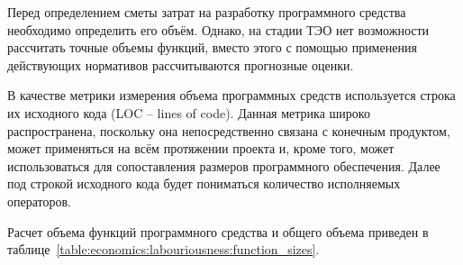 Перед определением сметы затрат на разработку программного средства необходимо определить его объём.
Однако, на стадии ТЭО нет возможности рассчитать точные объемы функций, вместо этого с помощью применения действующих нормативов рассчитываются прогнозные оценки.

В качестве метрики измерения объема программных средств используется строка их исходного кода (LOC -- lines of code).
Данная метрика широко распространена, поскольку она непосредственно связана с конечным продуктом, может применяться на всём протяжении проекта и, кроме того, может использоваться для сопоставления размеров программного обеспечения.
Далее под строкой исходного кода будет пониматься количество исполняемых операторов.

Расчет объема функций программного средства и общего объема приведен в таблице~\ref{table:economics:labouriousness:function_sizes}.

